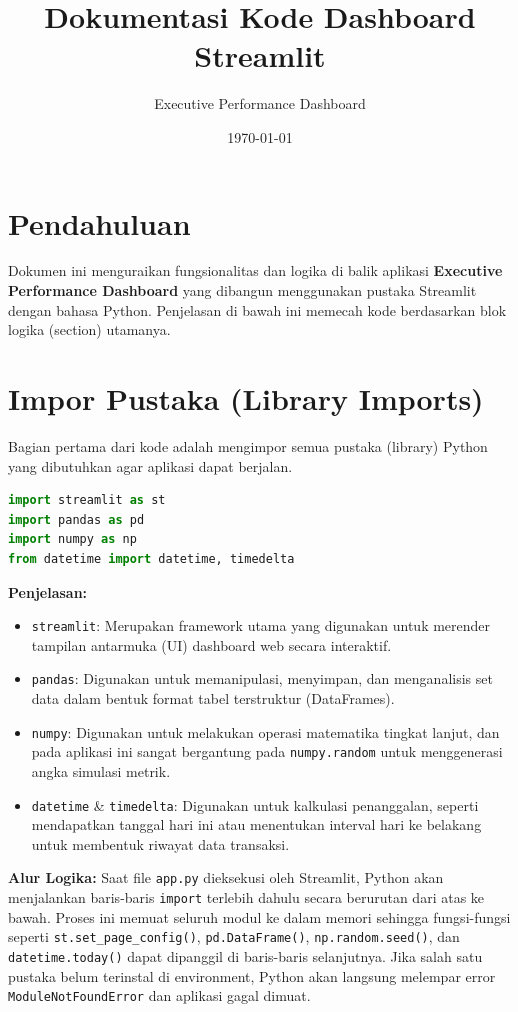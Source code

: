 \documentclass{article}
\title{Dokumentasi Kode Dashboard Streamlit}
\author{Executive Performance Dashboard}
\date{\today}
\begin{document}
\maketitle

\section*{Pendahuluan}
Dokumen ini menguraikan fungsionalitas dan logika di balik aplikasi \textbf{Executive Performance Dashboard} yang dibangun menggunakan pustaka Streamlit dengan bahasa Python. Penjelasan di bawah ini memecah kode berdasarkan blok logika (section) utamanya.

\section{Impor Pustaka (Library Imports)}
Bagian pertama dari kode adalah mengimpor semua pustaka (library) Python yang dibutuhkan agar aplikasi dapat berjalan.

\begin{lstlisting}[language=Python]
import streamlit as st
import pandas as pd
import numpy as np
from datetime import datetime, timedelta
\end{lstlisting}

\textbf{Penjelasan:}
\begin{itemize}
	\item \texttt{streamlit}: Merupakan framework utama yang digunakan untuk merender tampilan antarmuka (UI) dashboard web secara interaktif.
	\item \texttt{pandas}: Digunakan untuk memanipulasi, menyimpan, dan menganalisis set data dalam bentuk format tabel terstruktur (DataFrames).
	\item \texttt{numpy}: Digunakan untuk melakukan operasi matematika tingkat lanjut, dan pada aplikasi ini sangat bergantung pada \texttt{numpy.random} untuk menggenerasi angka simulasi metrik.
	\item \texttt{datetime} \& \texttt{timedelta}: Digunakan untuk kalkulasi penanggalan, seperti mendapatkan tanggal hari ini atau menentukan interval hari ke belakang untuk membentuk riwayat data transaksi.
\end{itemize}

\textbf{Alur Logika:}
Saat file \texttt{app.py} dieksekusi oleh Streamlit, Python akan menjalankan baris-baris \texttt{import} terlebih dahulu secara berurutan dari atas ke bawah. Proses ini memuat seluruh modul ke dalam memori sehingga fungsi-fungsi seperti \texttt{st.set\_page\_config()}, \texttt{pd.DataFrame()}, \texttt{np.random.seed()}, dan \texttt{datetime.today()} dapat dipanggil di baris-baris selanjutnya. Jika salah satu pustaka belum terinstal di environment, Python akan langsung melempar error \texttt{ModuleNotFoundError} dan aplikasi gagal dimuat.
\end{document}
